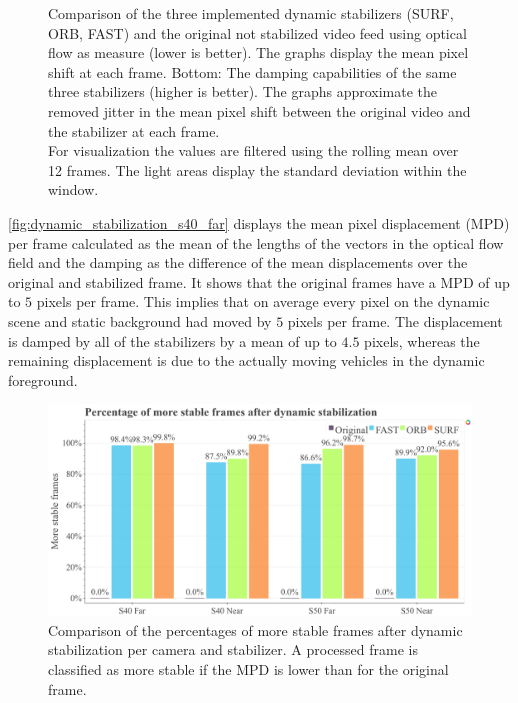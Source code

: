 \begin{figure}[t]
{        Comparison of the three implemented dynamic stabilizers (SURF, ORB, FAST) and the original not stabilized video feed using optical flow as measure (lower is better).
        The graphs display the mean pixel shift at each frame. 
        Bottom: 
        The damping capabilities of the same three stabilizers (higher is better). 
        The graphs approximate the removed jitter in the mean pixel shift between the original video and the stabilizer at each frame.\\
        For visualization the values are filtered using the rolling mean over 12 frames. 
        The light areas display the standard deviation within the window.
    }
    \label{fig:dynamic_stabilization_s40_far}
\end{figure}

\autoref{fig:dynamic_stabilization_s40_far} displays the mean pixel displacement (MPD) per frame calculated as the mean of the lengths of the vectors in the optical flow field and the damping as the difference of the mean displacements over the original and stabilized frame.
It shows that the original frames have a MPD of up to $5$ pixels per frame. This implies that on average every pixel on the dynamic scene and static background had moved by $5$ pixels per frame. 
The displacement is damped by all of the stabilizers by a mean of up to $4.5$ pixels, whereas the remaining displacement is due to the actually moving vehicles in the dynamic foreground.   

\begin{figure}[!ht]
      \includegraphics[width=\linewidth]{diagrams/optical_flow/stats.html.png}    
    \caption{
        Comparison of the percentages of more stable frames after dynamic stabilization per camera and stabilizer.
        A processed frame is classified as more stable if the MPD is lower than for the original frame. 
    }
    \label{fig:dynamic_stabilization}
\end{figure}

